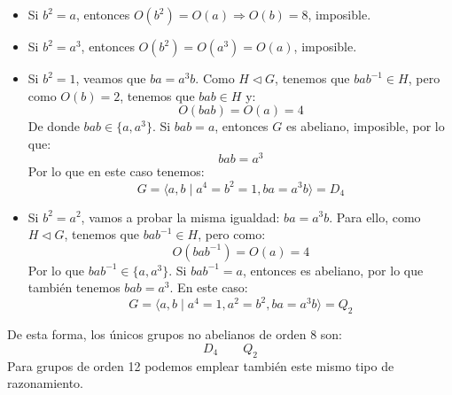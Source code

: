 \begin{itemize}
    \item Si $b^2 = a$, entonces $O(b^2) = O(a) \Longrightarrow O(b) = 8$, imposible.
    \item Si $b^2 = a^3$, entonces $O(b^2) = O(a^3) = O(a)$, imposible.
    \item Si $b^2 = 1$, veamos que $ba = a^3b$. Como $H\lhd G$, tenemos que $bab^{-1}\in H$, pero como $O(b) = 2$, tenemos que $bab\in H$ y:
        \begin{equation*}
            O(bab) = O(a) = 4
        \end{equation*}
        De donde $bab \in \{a,a^3\}$. Si $bab = a$, entonces $G$ es abeliano, imposible, por lo que:
        \begin{equation*}
            bab = a^3
        \end{equation*}
        Por lo que en este caso tenemos:
        \begin{equation*}
            G = \langle a,b \mid a^4 = b^2 = 1, ba=a^3b \rangle = D_4
        \end{equation*}
    \item Si $b^2 = a^2$, vamos a probar la misma igualdad: $ba=a^3b$. Para ello, como $H\lhd G$, tenemos que $bab^{-1}\in H$, pero como:
        \begin{equation*}
            O(bab^{-1}) = O(a) = 4
        \end{equation*}
        Por lo que $bab^{-1}\in \{a,a^3\}$. Si $bab^{-1}=a$, entonces es abeliano, por lo que también tenemos $bab=a^3$. En este caso:
        \begin{equation*}
            G = \langle a,b\mid a^4 = 1, a^2 = b^2, ba = a^3b \rangle = Q_2
        \end{equation*}
\end{itemize}
De esta forma, los únicos grupos no abelianos de orden 8 son:
\begin{equation*}
    D_4 \qquad Q_2
\end{equation*}
Para grupos de orden 12 podemos emplear también este mismo tipo de razonamiento.

